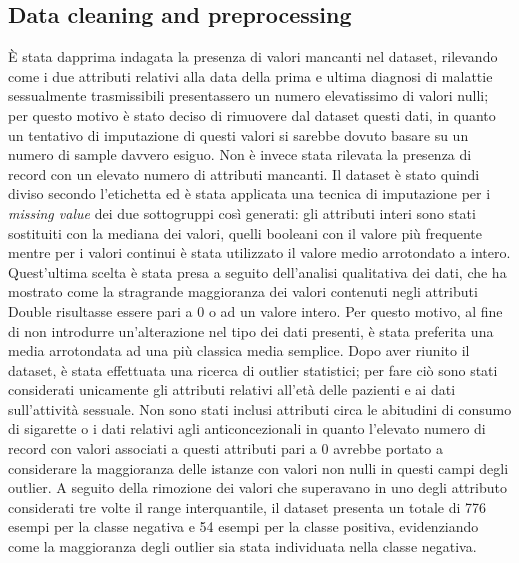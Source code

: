 \subsection{Data cleaning and preprocessing}
È stata dapprima indagata la presenza di valori mancanti nel dataset, rilevando come i due attributi relativi alla data della prima e ultima diagnosi di malattie sessualmente trasmissibili presentassero un numero elevatissimo di valori nulli; per questo motivo è stato deciso di rimuovere dal dataset questi dati, in quanto un tentativo di imputazione di questi valori si sarebbe dovuto basare su un numero di sample davvero esiguo. Non è invece stata rilevata la presenza di record con un elevato numero di attributi mancanti.
Il dataset è stato quindi diviso secondo l'etichetta ed è stata applicata una tecnica di imputazione per i \textit{missing value} dei due sottogruppi così generati: gli attributi interi sono stati sostituiti con la mediana dei valori, quelli booleani con il valore più frequente mentre per i valori continui è stata utilizzato il valore medio arrotondato a intero. Quest'ultima scelta è stata presa a seguito dell'analisi qualitativa dei dati, che ha mostrato come la stragrande maggioranza dei valori contenuti negli attributi Double risultasse essere pari a 0 o ad un valore intero. Per questo motivo, al fine di non introdurre un'alterazione nel tipo dei dati presenti, è stata preferita una media arrotondata ad una più classica media semplice.
Dopo aver riunito il dataset, è stata effettuata una ricerca di outlier statistici; per fare ciò sono stati considerati unicamente gli attributi relativi all'età delle pazienti e ai dati sull'attività sessuale. Non sono stati inclusi attributi circa le abitudini di consumo di sigarette o i dati relativi agli anticoncezionali in quanto l'elevato numero di record con valori associati a questi attributi pari a $0$ avrebbe portato a considerare la maggioranza delle istanze con valori non nulli in questi campi degli outlier. A seguito della rimozione dei valori che superavano in uno degli attributo considerati tre volte il range interquantile, il dataset presenta un totale di 776 esempi per la classe negativa e 54 esempi per la classe positiva, evidenziando come la maggioranza degli outlier sia stata individuata nella classe negativa.